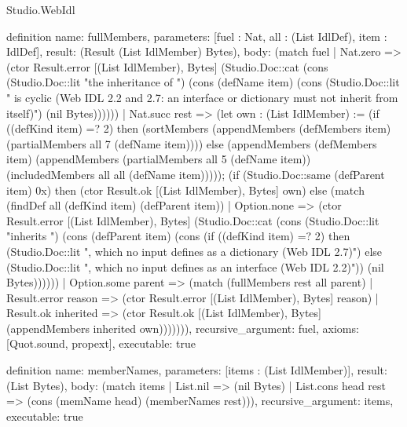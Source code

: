 \begin{lexlean}{Studio.WebIdl}
\begin{semanticmodule}
{{definition{
  name: fullMembers,
  parameters: [fuel : Nat, all : (List IdlDef), item : IdlDef],
  result: (Result (List IdlMember) Bytes),
  body: (match fuel
    | Nat.zero => (ctor Result.error [(List IdlMember), Bytes] (Studio.Doc::cat (cons (Studio.Doc::lit "the inheritance of ") (cons (defName item) (cons (Studio.Doc::lit " is cyclic (Web IDL 2.2 and 2.7: an interface or dictionary must not inherit from itself)") (nil Bytes))))))
    | Nat.succ rest => (let own : (List IdlMember) := (if ((defKind item) =? 2) then (sortMembers (appendMembers (defMembers item) (partialMembers all 7 (defName item)))) else (appendMembers (defMembers item) (appendMembers (partialMembers all 5 (defName item)) (includedMembers all all (defName item))))); (if (Studio.Doc::same (defParent item) 0x) then (ctor Result.ok [(List IdlMember), Bytes] own) else (match (findDef all (defKind item) (defParent item))
    | Option.none => (ctor Result.error [(List IdlMember), Bytes] (Studio.Doc::cat (cons (Studio.Doc::lit "inherits ") (cons (defParent item) (cons (if ((defKind item) =? 2) then (Studio.Doc::lit ", which no input defines as a dictionary (Web IDL 2.7)") else (Studio.Doc::lit ", which no input defines as an interface (Web IDL 2.2)")) (nil Bytes))))))
    | Option.some parent => (match (fullMembers rest all parent)
    | Result.error reason => (ctor Result.error [(List IdlMember), Bytes] reason)
    | Result.ok inherited => (ctor Result.ok [(List IdlMember), Bytes] (appendMembers inherited own))))))),
  recursive_argument: fuel,
  axioms: [Quot.sound, propext],
  executable: true
}

definition{
  name: memberNames,
  parameters: [items : (List IdlMember)],
  result: (List Bytes),
  body: (match items
    | List.nil => (nil Bytes)
    | List.cons head rest => (cons (memName head) (memberNames rest))),
  recursive_argument: items,
  executable: true
}

}}
\end{semanticmodule}
\end{lexlean}

